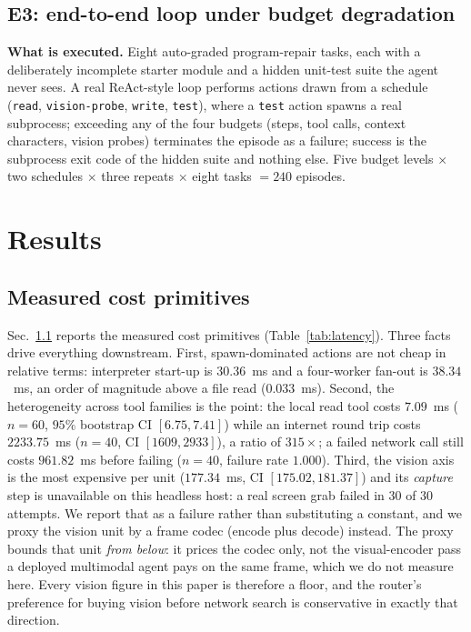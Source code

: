 \documentclass[10pt]{article} %
\begin{document}
\subsection{E3: end-to-end loop under budget degradation}
\label{sec:e3}

\textbf{What is executed.} Eight auto-graded program-repair tasks, each with a
deliberately incomplete starter module and a hidden unit-test suite the agent
never sees. A real ReAct-style loop performs actions drawn from a schedule
(\texttt{read}, \texttt{vision-probe}, \texttt{write}, \texttt{test}), where a
\texttt{test} action spawns a real subprocess; exceeding any of the four budgets
(steps, tool calls, context characters, vision probes) terminates the episode as
a failure; success is the subprocess exit code of the hidden suite and nothing
else. Five budget levels $\times$ two schedules $\times$ three repeats
$\times$ eight tasks $= 240$ episodes.

\section{Results}
\label{sec:results}

\subsection{Measured cost primitives}
\label{sec:res-e1}

Sec.~\ref{sec:res-e1} reports the measured cost primitives (Table~\ref{tab:latency}). Three facts drive
everything downstream. First, spawn-dominated actions are not cheap in relative
terms: interpreter start-up is $30.36$~ms and a four-worker fan-out is
$38.34$~ms, an order of magnitude above a file read ($0.033$~ms). Second, the
heterogeneity across tool families is the point: the local read tool costs
$7.09$~ms ($n{=}60$, $95\%$ bootstrap CI $[6.75, 7.41]$) while an internet round
trip costs $2233.75$~ms ($n{=}40$, CI $[1609, 2933]$), a ratio of $315\times$;
a failed network call still costs $961.82$~ms before failing ($n{=}40$, failure
rate $1.000$). Third, the vision axis is the most expensive per unit
($177.34$~ms, CI $[175.02, 181.37]$) and its \emph{capture} step is unavailable
on this headless host: a real screen grab failed in $30$ of $30$ attempts. We report
that as a failure rather than substituting a constant, and we proxy the vision
unit by a frame codec (encode plus decode) instead. The proxy bounds that unit
\emph{from below}: it prices the codec only, not the visual-encoder pass a deployed
multimodal agent pays on the same frame, which we do not measure here. Every vision figure in
this paper is therefore a floor, and the router's preference for buying vision before network
search is conservative in exactly that direction.
\end{document}
